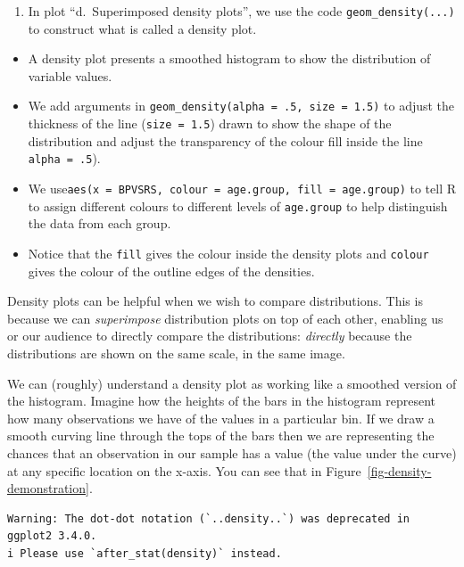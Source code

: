 \documentclass[
  letterpaper,
  DIV=11,
  numbers=noendperiod]{scrreprt}
\providecommand{\tightlist}{%
  \setlength{\itemsep}{0pt}\setlength{\parskip}{0pt}}\usepackage{longtable,booktabs,array}
\begin{document}
\begin{enumerate}
\def\labelenumi{\arabic{enumi}.}
\setcounter{enumi}{3}
\tightlist
\item
  In plot ``d.~Superimposed density plots'', we use the code
  \texttt{geom\_density(...)} to construct what is called a density
  plot.
\end{enumerate}

\begin{itemize}
\tightlist
\item
  A density plot presents a smoothed histogram to show the distribution
  of variable values.
\item
  We add arguments in
  \texttt{geom\_density(alpha\ =\ .5,\ size\ =\ 1.5)} to adjust the
  thickness of the line (\texttt{size\ =\ 1.5}) drawn to show the shape
  of the distribution and adjust the transparency of the colour fill
  inside the line \texttt{alpha\ =\ .5}).
\item
  We
  use\texttt{aes(x\ =\ BPVSRS,\ colour\ =\ age.group,\ fill\ =\ age.group)}
  to tell R to assign different colours to different levels of
  \texttt{age.group} to help distinguish the data from each group.
\item
  Notice that the \texttt{fill} gives the colour inside the density
  plots and \texttt{colour} gives the colour of the outline edges of the
  densities.
\end{itemize}

Density plots can be helpful when we wish to compare distributions. This
is because we can \emph{superimpose} distribution plots on top of each
other, enabling us or our audience to directly compare the
distributions: \emph{directly} because the distributions are shown on
the same scale, in the same image.

We can (roughly) understand a density plot as working like a smoothed
version of the histogram. Imagine how the heights of the bars in the
histogram represent how many observations we have of the values in a
particular bin. If we draw a smooth curving line through the tops of the
bars then we are representing the chances that an observation in our
sample has a value (the value under the curve) at any specific location
on the x-axis. You can see that in
Figure~\ref{fig-density-demonstration}.

\begin{verbatim}
Warning: The dot-dot notation (`..density..`) was deprecated in ggplot2 3.4.0.
i Please use `after_stat(density)` instead.
\end{verbatim}
\end{document}
